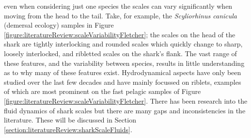 \documentclass[12pt,oneside,a4paper]{article}
\begin{document}
even when considering just one species the scales can vary significantly when moving from the head to the tail. Take, for example, the \textit{Scyliorhinus canicula} (demersal ecology) samples in Figure \ref{figure:literatureReview:scaleVariabilityFletcher}; the scales on the head of the shark are tightly interlocking and rounded scales which quickly change to sharp, loosely interlocked, and ribletted scales on the shark's flank. The vast range of these features, and the variability between species, results in little understanding as to why many of these features exist. Hydrodynamical aspects have only been studied over the last few decades \citep{dean2010} and have mainly focussed on riblets, examples of which are most prominent on the fast pelagic samples of Figure \ref{figure:literatureReview:scaleVariabilityFletcher}. There has been research into the fluid dynamics of shark scales but there are many gaps and inconsistencies in the literature. These will be discussed in Section \ref{section:literatureReview:sharkScaleFluids}.
%
\end{document}
